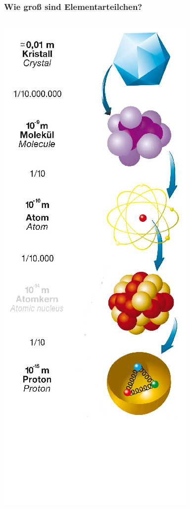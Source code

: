 \documentclass{beamer}
\begin{document}
\begin{frame}
  \frametitle{Wie gro\ss{} sind Elementarteilchen?}
  \vskip-0.2cm
  \begin{columns}[T]
    \begin{column}{0.25\textwidth}
      \centering
      \includegraphics[width=\textwidth]{matter/VKZQ_Proton.png}

\end{column}
\end{columns}
\end{frame}
\end{document}
